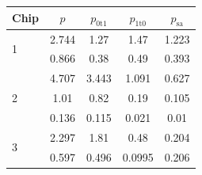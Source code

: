 \begin{center}\small
\begin{tabular}{| l | c | c | c | c |}
	\hline
	Chip & $p$ & $p_{\text{0t1}}$ & $p_{\text{1t0}}$ & $p_{\text{sa}}$ \\
	\hline
	\multirow{2}{*}{1} & 2.744 & 1.27 & 1.47 & 1.223\\
	& 0.866 & 0.38 & 0.49 & 0.393\\
	\hline
	\multirow{3}{*}{2} & 4.707 &  3.443 & 1.091 & 0.627\\
	& 1.01 &  0.82 & 0.19 & 0.105\\
	& 0.136 & 0.115 & 0.021 & 0.01 \\
	\hline
	\multirow{2}{*}{3} & 2.297 & 1.81 & 0.48 & 0.204 \\
	& 0.597 & 0.496 & 0.0995 & 0.206 \\
	\hline
\end{tabular}
\end{center}

